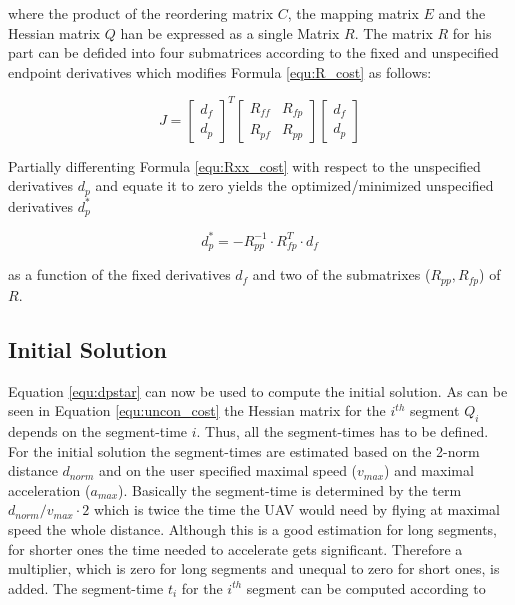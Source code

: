 where the product of the reordering matrix $C$, the mapping matrix $E$ and the Hessian matrix $Q$ han be expressed as a single Matrix $R$. The matrix $R$ for his part can be defided into four submatrices according to the fixed and unspecified endpoint derivatives which modifies Formula \ref{equ:R_cost} as follows:

\begin{equation}
J =
\begin{bmatrix}
   d_f \\
  d_p
\end{bmatrix}^T
\begin{bmatrix}
   R_{ff} & R_{fp} \\
  R_{pf} & R_{pp}
\end{bmatrix}
\begin{bmatrix}
   d_f \\
  d_p
\end{bmatrix}
\label{equ:Rxx_cost}
\end{equation}

Partially differenting Formula \ref{equ:Rxx_cost} with respect to the unspecified derivatives $d_p$ and equate it to zero yields the optimized/minimized unspecified derivatives $d_p^*$ 

\begin{equation}
d_p^* = - R_{pp}^{-1} \cdot R_{fp}^T \cdot d_f
\label{equ:dpstar}
\end{equation}

as a function of the fixed derivatives $d_f$ and two of the submatrixes ($R_{pp}, R_{fp}$) of $R$.


\subsection{Initial Solution}\label{sec:initialSolution}

Equation \ref{equ:dpstar} can now be used to compute the initial solution. As can be seen in Equation \ref{equ:uncon_cost} the Hessian matrix for the  $ i^{th}$ segment $Q_i$ depends on the segment-time $i$. Thus, all the segment-times has to be defined. For the initial solution the segment-times are estimated based on the 2-norm distance $d_{norm}$ and on the user specified maximal speed ($v_{max}$) and maximal acceleration ($a_{max}$). \newline
Basically the segment-time is determined by the term $d_{norm}/v_{max} \cdot 2$ which is twice the time the UAV would need by flying at maximal speed the whole distance. Although this is a good estimation for long segments, for shorter ones the time needed to accelerate gets significant. Therefore a multiplier, which is zero for long segments and unequal to zero for short ones, is added. The segment-time $t_i$ for the $i^{th}$ segment can be computed according to 

